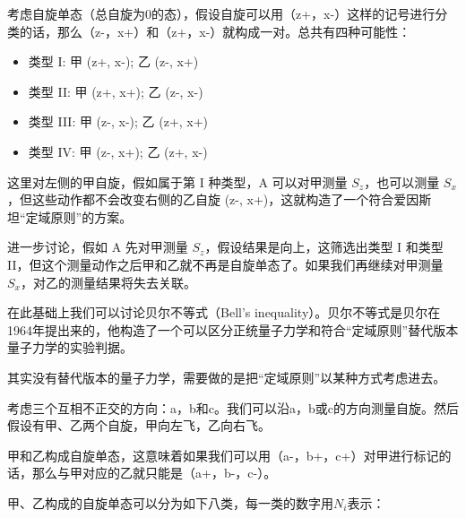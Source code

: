 考虑自旋单态（总自旋为0的态），假设自旋可以用（z+，x-）这样的记号进行分类的话，那么（z-，x+）和（z+，x-）就构成一对。总共有四种可能性：

\begin{itemize}
  \item 类型 I: 甲 (z+, x-);  乙 (z-, x+)
  \item 类型 II: 甲 (z+, x+);  乙 (z-, x-)
  \item 类型 III: 甲 (z-, x-);  乙 (z+, x+)
  \item 类型 IV: 甲 (z-, x+);  乙 (z+, x-)
\end{itemize}

这里对左侧的甲自旋，假如属于第 I 种类型，A 可以对甲测量 $S_z$，也可以测量 $S_x$，但这些动作都不会改变右侧的乙自旋 (z-, x+)，这就构造了一个符合爱因斯坦“定域原则”的方案。

进一步讨论，假如 A 先对甲测量 $S_z$，假设结果是向上，这筛选出类型 I 和类型 II，但这个测量动作之后甲和乙就不再是自旋单态了。如果我们再继续对甲测量 $S_x$，对乙的测量结果将失去关联。

在此基础上我们可以讨论贝尔不等式（Bell's inequality）。贝尔不等式是贝尔在1964年提出来的，他构造了一个可以区分正统量子力学和符合“定域原则”替代版本量子力学的实验判据。

其实没有替代版本的量子力学，需要做的是把“定域原则”以某种方式考虑进去。

考虑三个互相不正交的方向：a，b和c。我们可以沿a，b或c的方向测量自旋。然后假设有甲、乙两个自旋，甲向左飞，乙向右飞。

甲和乙构成自旋单态，这意味着如果我们可以用（a-，b+，c+）对甲进行标记的话，那么与甲对应的乙就只能是（a+，b-，c-）。

甲、乙构成的自旋单态可以分为如下八类，每一类的数字用$N_i$表示：
